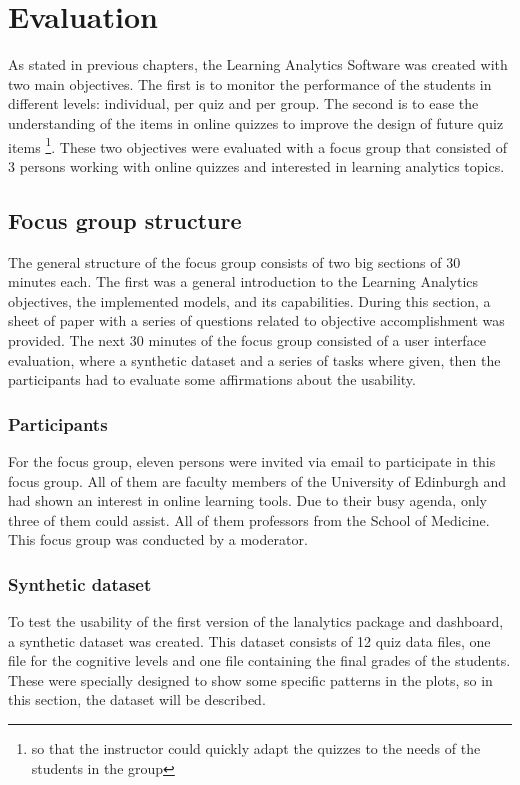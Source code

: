 
\chapter{Evaluation}

As stated in previous chapters, the Learning Analytics Software was created with two main objectives. The first is to monitor the performance of the students in different levels: individual, per quiz and per group. The second is to ease the understanding of the items in online quizzes to improve the design of future quiz items \footnote{so that the instructor could quickly adapt the quizzes to the needs of the students in the group}. These two objectives were evaluated with a focus group that consisted of 3 persons working with online quizzes and interested in learning analytics topics. 

\section{Focus group structure}

The general structure of the focus group consists of two big sections of 30 minutes each. The first was a general introduction to the Learning Analytics objectives, the implemented models, and its capabilities. During this section, a sheet of paper with a series of questions related to objective accomplishment was provided. The next 30 minutes of the focus group consisted of a user interface evaluation, where a synthetic dataset and a series of tasks where given, then the participants had to evaluate some affirmations about the usability.

\subsection{Participants}
For the focus group, eleven persons were invited via email to participate in this focus group. All of them are faculty members of the University of Edinburgh and had shown an interest in online learning tools. Due to their busy agenda, only three of them could assist. All of them professors from the School of Medicine. This focus group was conducted by a moderator.

\subsection{Synthetic dataset}

To test the usability of the first version of the lanalytics package and dashboard, a synthetic dataset was created. This dataset consists of 12 quiz data files, one file for the cognitive levels and one file containing the final grades of the students. These were specially designed to show some specific patterns in the plots, so in this section, the dataset will be described. 

